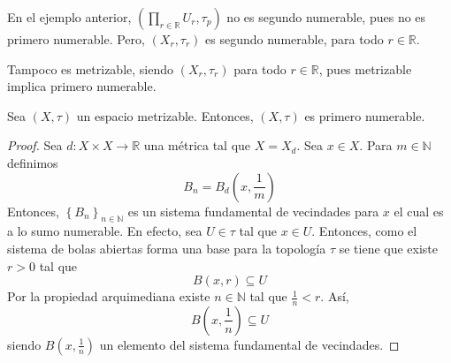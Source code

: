\documentclass[12pt]{report}
\theoremstyle{largebreak}
\newcommand\cf[3]{\ensuremath{#1:#2\rightarrow#3}}
\begin{document}
    \begin{obs}
        En el ejemplo anterior, $\left(\prod_{ r\in\mathbb{R}}U_r,\tau_p \right)$ no es segundo numerable, pues no es primero numerable. Pero, $(X_r,\tau_r)$ es segundo numerable, para todo $r\in\mathbb{R}$.

        Tampoco es metrizable, siendo $(X_r,\tau_r)$ para todo $r\in\mathbb{R}$, pues metrizable implica primero numerable.
    \end{obs}

    \begin{propo}
        Sea $(X,\tau)$ un espacio metrizable. Entonces, $(X,\tau)$ es primero numerable.
    \end{propo}

    \begin{proof}
        Sea $\cf{d}{X\times X}{\mathbb{R}}$ una métrica tal que $X=X_d$. Sea $x\in X$. Para $m\in\mathbb{N}$ definimos
        \begin{equation*}
            B_n=B_d\left(x,\frac{1}{m}\right)
        \end{equation*}
        Entonces, $\left\{B_n\right\}_{ n\in\mathbb{N}}$ es un sistema fundamental de vecindades para $x$ el cual es a lo sumo numerable. En efecto, sea $U\in\tau$ tal que $x\in U$. Entonces, como el sistema de bolas abiertas forma una base para la topología $\tau$ se tiene que existe $r>0$ tal que
        \begin{equation*}
            B(x,r)\subseteq U
        \end{equation*}
        Por la propiedad arquimediana existe $n\in\mathbb{N}$ tal que $\frac{1}{n}<r$. Así,
        \begin{equation*}
            B\left(x,\frac{1}{n}\right)\subseteq U
        \end{equation*}
        siendo $B(x,\frac{1}{n})$ un elemento del sistema fundamental de vecindades.
    \end{proof}
\end{document}
